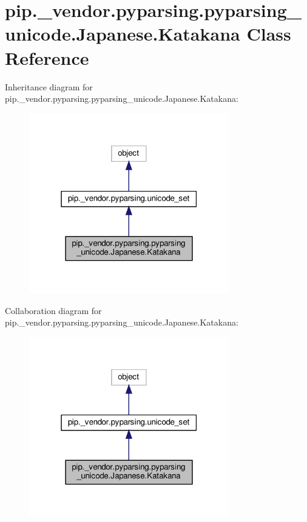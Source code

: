 \hypertarget{classpip_1_1__vendor_1_1pyparsing_1_1pyparsing__unicode_1_1Japanese_1_1Katakana}{}\section{pip.\+\_\+vendor.\+pyparsing.\+pyparsing\+\_\+unicode.\+Japanese.\+Katakana Class Reference}
\label{classpip_1_1__vendor_1_1pyparsing_1_1pyparsing__unicode_1_1Japanese_1_1Katakana}


Inheritance diagram for pip.\+\_\+vendor.\+pyparsing.\+pyparsing\+\_\+unicode.\+Japanese.\+Katakana\+:
\nopagebreak
\begin{figure}[H]
\begin{center}
\leavevmode
\includegraphics[width=247pt]{classpip_1_1__vendor_1_1pyparsing_1_1pyparsing__unicode_1_1Japanese_1_1Katakana__inherit__graph}
\end{center}
\end{figure}


Collaboration diagram for pip.\+\_\+vendor.\+pyparsing.\+pyparsing\+\_\+unicode.\+Japanese.\+Katakana\+:
\nopagebreak
\begin{figure}[H]
\begin{center}
\leavevmode
\includegraphics[width=247pt]{classpip_1_1__vendor_1_1pyparsing_1_1pyparsing__unicode_1_1Japanese_1_1Katakana__coll__graph}
\end{center}
\end{figure}
